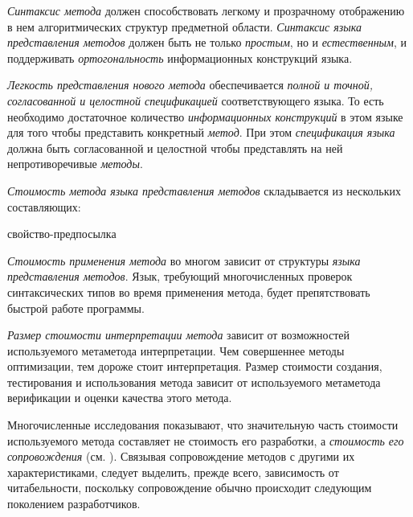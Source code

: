 \textit{Синтаксис метода} должен способствовать легкому и прозрачному отображению в нем алгоритмических структур предметной области. \textit{Синтаксис языка представления методов} должен быть не только \textit{простым}, но и \textit{естественным}, и поддерживать \textit{ортогональность} информационных конструкций языка.

\textit{Легкость представления нового метода} обеспечивается \textit{полной и точной, согласованной и целостной спецификацией} соответствующего языка. То есть необходимо достаточное количество \textit{информационных конструкций} в этом языке для того чтобы представить конкретный \textit{метод}. При этом \textit{спецификация языка} должна быть согласованной и целостной чтобы представлять на ней непротиворечивые \textit{методы}.

\textit{Стоимость метода языка представления методов} складывается из нескольких составляющих:

\begin{SCn}
\begin{scnrelfromlist}{свойство-предпосылка}
\end{scnrelfromlist}
\end{SCn}

\textit{Стоимость применения метода} во многом зависит от структуры \textit{языка представления методов}. Язык, требующий многочисленных проверок синтаксических типов во время применения метода, будет препятствовать быстрой работе программы.

\textit{Размер стоимости интерпретации метода} зависит от возможностей используемого метаметода интерпретации. Чем совершеннее методы оптимизации, тем дороже стоит интерпретация.
Размер стоимости создания, тестирования и использования метода зависит от используемого метаметода верификации и оценки качества этого метода.

Многочисленные исследования показывают, что значительную часть стоимости используемого метода составляет не стоимость его разработки, а \textit{стоимость его сопровождения} (см. ). Связывая сопровождение методов с другими их характеристиками, следует выделить, прежде всего, зависимость от читабельности, поскольку сопровождение обычно происходит следующим поколением разработчиков.

